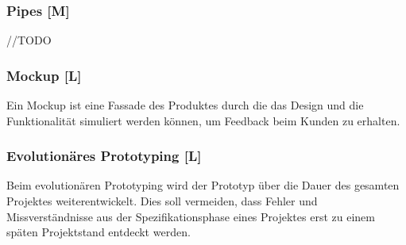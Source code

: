 \subsubsection{Pipes [M]}
//TODO

\subsubsection{Mockup [L]}
\label{glos:mockup}
Ein Mockup ist eine Fassade des Produktes durch die das Design und die Funktionalität simuliert werden können, um Feedback beim Kunden zu erhalten. \cite{Mokup}


\subsubsection{Evolutionäres Prototyping [L]}
\label{ch::ongoing-prototyping}
Beim evolutionären Prototyping wird der Prototyp über die Dauer des gesamten Projektes weiterentwickelt. Dies soll vermeiden, dass Fehler und Missverständnisse aus der Spezifikationsphase eines Projektes erst zu einem späten Projektstand entdeckt werden. \cite{Prototyping}